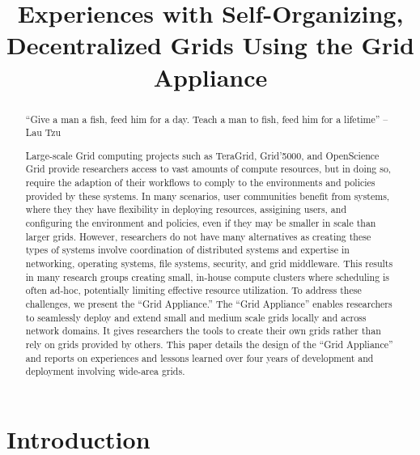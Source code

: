 \documentclass[conference]{IEEEtran}
\begin{document}
\title{Experiences with Self-Organizing, Decentralized Grids Using the Grid
Appliance}

\author{
}

\maketitle


\begin{abstract}

``Give a man a fish, feed him for a day.  Teach a man to fish, feed him for a
lifetime'' -- Lau Tzu

Large-scale Grid computing projects such as TeraGrid, Grid'5000, and
OpenScience Grid provide researchers access to vast amounts of compute
resources, but in doing so, require the adaption of their workflows to comply
to the environments and policies provided by these systems.  In many scenarios,
user communities benefit from systems, where they they have flexibility in
deploying resources, assigining users, and configuring the environment and
policies, even if they may be smaller in scale than larger grids. However,
researchers do not have many alternatives as creating these types of systems
involve coordination of distributed systems and expertise in networking,
operating systems, file systems, security, and grid middleware.  This results
in many research groups creating small, in-house compute clusters where
scheduling is often ad-hoc, potentially limiting effective resource
utilization.  To address these challenges, we present the ``Grid Appliance.''
The ``Grid Appliance'' enables researchers to seamlessly deploy and extend
small and medium scale grids locally and across network domains.  It gives
researchers the tools to create their own grids rather than rely on grids
provided by others.  This paper details the design of the ``Grid Appliance''
and reports on experiences and lessons learned over four years of development
and deployment involving wide-area grids.

\end{abstract}

\section{Introduction}
\end{document}
